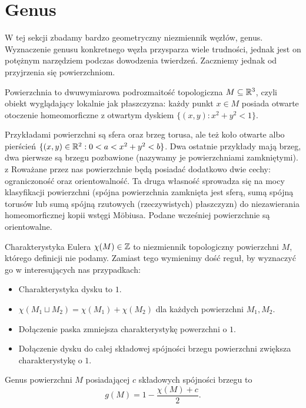 \section{Genus} %
\label{sec:genus}
W tej sekcji zbadamy bardzo geometryczny niezmiennik węzłów, genus.
Wyznaczenie genusu konkretnego węzła przysparza wiele trudności, jednak jest on potężnym narzędziem podczas dowodzenia twierdzeń.
Zaczniemy jednak od przyjrzenia się powierzchniom.

\begin{definition} 
    Powierzchnia to dwuwymiarowa podrozmaitość topologiczna $M \subseteq \mathbb R^3$, czyli obiekt wyglądający lokalnie jak płaszczyzna: każdy punkt $x \in M$ posiada otwarte otoczenie homeomorficzne z otwartym dyskiem $\{(x,y) : x^2 + y^2 < 1\}$.
\end{definition}

Przykładami powierzchni są sfera oraz brzeg torusa, ale też koło otwarte albo pierścień $\{(x, y) \in \mathbb R^2 : 0 < a < x^2 + y^2 < b\}$.
Dwa ostatnie przykłady mają brzeg, dwa pierwsze są brzegu pozbawione (nazywamy je powierzchniami zamkniętymi).
z
Roważane przez nas powierzchnie będą posiadać dodatkowo dwie cechy: ograniczoność oraz orientowalność.
Ta druga własność sprowadza się na mocy klasyfikacji powierzchni (spójna powierzchnia zamknięta jest sferą, sumą spójną torusów lub sumą spójną rzutowych (rzeczywistych) płaszczyzn) do niezawierania homeomorficznej kopii wstęgi Möbiusa.
Podane wcześniej powierzchnie są orientowalne.

\begin{definition} 
    Charakterystyka Eulera $\chi(M) \in \mathbb Z$ to niezmiennik 
    topologiczny powierzchni $M$, którego definicji nie podamy.
    Zamiast tego wymienimy dość reguł, 
    by wyznaczyć go w interesujących nas przypadkach:
    \begin{itemize}
        \item Charakterystyka dysku to $1$.
        \item $\chi(M_1 \sqcup M_2)=\chi(M_1) + \chi(M_2)$ dla każdych powierzchni $M_1, M_2$.
        \item Dołączenie paska zmniejsza charakterystykę powerzchni o $1$.
        \item Dołączenie dysku do całej składowej spójności brzegu powierzchni zwiększa charakterystykę o $1$.
    \end{itemize}
\end{definition}

\begin{definition} 
    Genus powierzchni $M$ posiadającej $c$ składowych spójności brzegu to 
    \[
        g(M) = 1 - \frac{\chi(M) + c}{2}.
    \]
\end{definition}

